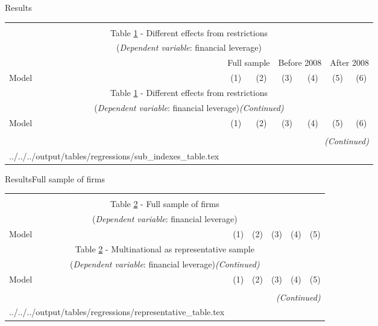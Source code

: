 \documentclass{beamer}
\makeatletter
\newcommand\primitiveinput[1]
{\@@input #1 }
\makeatother
\begin{document}
\begin{frame}{Results}{}

{\fontsize{5}{6}\selectfont 		
	\begin{longtable}{lcccccc}\\
		\label{reg:sub}\\
		\multicolumn{7}{c}{Table \ref{reg:sub} - Different effects from restrictions}\\
		\multicolumn{7}{c}{(\textit{Dependent variable}: financial leverage)}
		\\ \hline \hline \addlinespace
		& \multicolumn{2}{c}{Full sample} & \multicolumn{2}{c}{Before 2008} & \multicolumn{2}{c}{After 2008} \\  
		Model & (1) & (2) & (3) & (4)& (5)& (6) \\	
		\endfirsthead
		\multicolumn{7}{c}{Table \ref{reg:sub} - Different effects from restrictions}\\
		\multicolumn{7}{c}{(\textit{Dependent variable}: financial leverage)\textit{(Continued)}}
		\\ \hline \hline \addlinespace Model & (1) & (2) & (3) & (4)& (5)& (6)  \\ \hline \\ \endhead
		\hline
		\multicolumn{7}{r}{{\textit{(Continued)}}}\\ \endfoot  	
		\endlastfoot
		\primitiveinput{../../../output/tables/regressions/sub_indexes_table.tex}
		\hline 			
	\end{longtable}		
}


\end{frame}

\begin{frame}{Results}{Full sample of firms}

{\fontsize{6}{7}\selectfont 		
		\begin{longtable}{lccccc}\\
		\label{reg:rep}\\
		\multicolumn{6}{c}{Table \ref{reg:rep} - Full sample of firms}\\
		\multicolumn{6}{c}{(\textit{Dependent variable}: financial leverage)}
		\\ \hline \hline \addlinespace
		Model & (1) & (2) & (3) & (4) & (5) \\  \endfirsthead
		\multicolumn{6}{c}{Table \ref{reg:rep} - Multinational as representative sample}\\
		\multicolumn{6}{c}{(\textit{Dependent variable}: financial leverage)\textit{(Continued)}}
		\\ \hline \hline \addlinespace Model & (1) & (2) & (3) & (4) & (5) \\ \hline \\ \endhead
		\hline
		\multicolumn{6}{r}{{\textit{(Continued)}}}\\ \endfoot 	
		\endlastfoot
		\primitiveinput{../../../output/tables/regressions/representative_table.tex}
		\hline 			
	\end{longtable}		
}


\end{frame}
\end{document}
